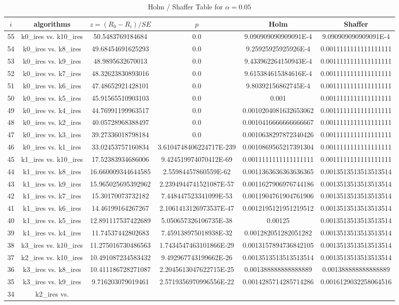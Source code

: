 \documentclass[a4paper,10pt]{article}
\begin{document}
\begin{landscape}
\begin{table}[!htp]
\centering\tiny
\caption{Holm / Shaffer Table for $\alpha=0.05$}
\begin{tabular}{cccccc}
$i$&algorithms&$z=(R_0 - R_i)/SE$&$p$&Holm&Shaffer\\
\hline
55&k0_ires vs. k10_ires&50.5483769184684&0.0&9.090909090909091E-4&9.090909090909091E-4\\54&k0_ires vs. k8_ires&49.68454691625293&0.0&9.25925925925926E-4&0.0011111111111111111\\53&k0_ires vs. k9_ires&48.9895632670013&0.0&9.433962264150943E-4&0.0011111111111111111\\52&k0_ires vs. k7_ires&48.32623830893016&0.0&9.615384615384616E-4&0.0011111111111111111\\51&k0_ires vs. k6_ires&47.48652921428101&0.0&9.80392156862745E-4&0.0011111111111111111\\50&k0_ires vs. k5_ires&45.91565510903103&0.0&0.001&0.0011111111111111111\\49&k0_ires vs. k4_ires&44.76991199963517&0.0&0.0010204081632653062&0.0011111111111111111\\48&k0_ires vs. k2_ires&40.05728968388497&0.0&0.0010416666666666667&0.0011111111111111111\\47&k0_ires vs. k3_ires&39.27336018798184&0.0&0.0010638297872340426&0.0011111111111111111\\46&k0_ires vs. k1_ires&33.02453757160834&3.6104748406224717E-239&0.0010869565217391304&0.0011111111111111111\\45&k1_ires vs. k10_ires&17.52383934686006&9.424519974070412E-69&0.0011111111111111111&0.0011111111111111111\\44&k1_ires vs. k8_ires&16.660009344644585&2.55984457860559E-62&0.0011363636363636365&0.0013513513513513514\\43&k1_ires vs. k9_ires&15.965025695392962&2.2394944741521087E-57&0.0011627906976744186&0.0013513513513513514\\42&k1_ires vs. k7_ires&15.30170073732182&7.448447523341099E-53&0.0011904761904761906&0.0013513513513513514\\41&k1_ires vs. k6_ires&14.46199164267267&2.1061413126973537E-47&0.0012195121951219512&0.0013513513513513514\\40&k1_ires vs. k5_ires&12.891117537422689&5.050657326106735E-38&0.00125&0.0013513513513513514\\39&k1_ires vs. k4_ires&11.74537442802683&7.459138975018938E-32&0.001282051282051282&0.0013513513513513514\\38&k3_ires vs. k10_ires&11.275016730486563&1.7434547463101866E-29&0.0013157894736842105&0.0013513513513513514\\37&k2_ires vs. k10_ires&10.491087234583432&9.492967743199662E-26&0.0013513513513513514&0.0013513513513513514\\36&k3_ires vs. k8_ires&10.411186728271087&2.2045613047622715E-25&0.001388888888888889&0.001388888888888889\\35&k3_ires vs. k9_ires&9.716203079019461&2.5719356970996556E-22&0.0014285714285714286&0.0016129032258064516\\34&k2_ires vs. 
\end{tabular}
\end{table}
\end{landscape}
\end{document}
